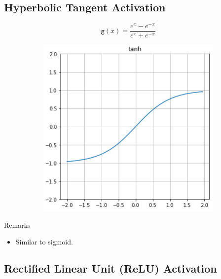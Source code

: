 \documentclass{book}
\newcommand{\act}{\texttt{g}}%
\begin{document}
\subsection{Hyperbolic Tangent Activation}

\begin{figure}[h]
    \centering
    \begin{subfigure}{.5\textwidth}
        \[
        \act(x)= \frac{e^x - e^{-x}}{e^x + e^{-x}}
        \]
    \end{subfigure}
    \begin{subfigure}{.5\textwidth}
        \includegraphics[width=.8\textwidth]{act_tanh.png}
    \end{subfigure}
\end{figure}

\begin{block}{Remarks}
\begin{itemize}
\item Similar to sigmoid.
\end{itemize}
\end{block}

\subsection{Rectified Linear Unit (ReLU) Activation}
\end{document}
